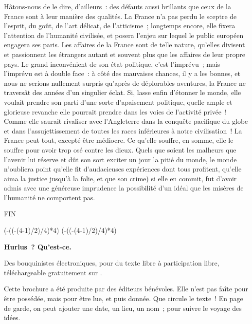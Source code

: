 \documentclass[french,twoside]{book} %
\def\truncdiv#1#2{((#1-(#2-1)/2)/#2)}
\def\moduloop#1#2{(#1-\truncdiv{#1}{#2}*#2)}
\def\modulo#1#2{\number\numexpr\moduloop{#1}{#2}\relax}
\begin{document}
Hâtons-nous de le dire, d’ailleurs : des défauts aussi brillants que ceux de la France sont à leur manière des qualités. La France n’a pas perdu le sceptre de l’esprit, du goût, de l’art délicat, de l’atticisme ; longtemps encore, elle fixera l’attention de l’humanité civilisée, et posera l’enjeu sur lequel le public européen engagera ses paris. Les affaires de la France sont de telle nature, qu’elles divisent et passionnent les étrangers autant et souvent plus que les affaires de leur propre pays. Le grand inconvénient de son état politique, c’est l’imprévu ; mais l’imprévu est à double face : à côté des mauvaises chances, il y a les bonnes, et nous ne serions nullement surpris qu’après de déplorables aventures, la France ne traversât des années d’un singulier éclat. Si, lasse enfin d’étonner le monde, elle voulait prendre son parti d’une sorte d’apaisement politique, quelle ample et glorieuse revanche elle pourrait prendre dans les voies de l’activité privée ! Comme elle saurait rivaliser avec l’Angleterre dans la conquête pacifique du globe et dans l’assujettissement de toutes les races inférieures à notre civilisation ! La France peut tout, excepté être médiocre. Ce qu’elle souffre, en somme, elle le souffre pour avoir trop osé contre les dieux. Quels que soient les malheurs que l’avenir lui réserve et dût son sort exciter un jour la pitié du monde, le monde n’oubliera point qu’elle fit d’audacieuses expériences dont tous profitent, qu’elle aima la justice jusqu’à la folie, et que son crime) si elle en commit, fut d’avoir admis avec une généreuse imprudence la possibilité d’un idéal que les misères de l’humanité ne comportent pas.\par


\begin{raggedleft}FIN\end{raggedleft}
 


\ifbooklet
  \pagestyle{empty}
  \clearpage
  \ifnum\modulo{\value{page}}{4}=0 \hbox{}\newpage\hbox{}\newpage\fi
  \ifnum\modulo{\value{page}}{4}=1 \hbox{}\newpage\hbox{}\newpage\fi


  \hbox{}\newpage
  \ifodd\value{page}\hbox{}\newpage\fi
  {\centering\color{rubric}\bfseries\noindent\large
    Hurlus ? Qu’est-ce.\par
    \bigskip
  }
  \noindent Des bouquinistes électroniques, pour du texte libre à participation libre,
  téléchargeable gratuitement sur \href{https://hurlus.fr}{}.\par
  \bigskip
  \noindent Cette brochure a été produite par des éditeurs bénévoles.
  Elle n’est pas faîte pour être possédée, mais pour être lue, et puis donnée.
  Que circule le texte !
  En page de garde, on peut ajouter une date, un lieu, un nom ; pour suivre le voyage des idées.
  \par
\end{document}

